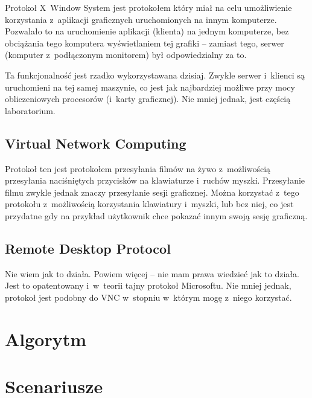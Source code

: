 \documentclass{article}
\begin{document}
Protokoł X~Window System jest protokołem który miał na celu umożliwienie
korzystania z~aplikacji graficznych uruchomionych na innym komputerze.
Pozwalało to na uruchomienie aplikacji (klienta) na jednym komputerze,
bez obciążania tego komputera wyświetlaniem tej grafiki -- zamiast tego,
serwer (komputer z~podłączonym monitorem) był odpowiedzialny za to.

Ta funkcjonalność jest rzadko wykorzystawana dzisiaj. Zwykle serwer
i~klienci są uruchomieni na tej samej maszynie, co jest jak najbardziej
możliwe przy mocy obliczeniowych procesorów (i~karty graficznej). Nie
mniej jednak, jest częścią laboratorium.

\subsection{Virtual Network Computing}

Protokoł ten jest protokołem przesyłania filmów na żywo z~możliwością
przesyłania naciśniętych przycisków na klawiaturze i~ruchów myszki.
Przesyłanie filmu zwykle jednak znaczy przesyłanie sesji graficznej.
Można korzystać z~tego protokołu z~możliwością korzystania klawiatury
i~myszki, lub bez niej, co jest przydatne gdy na przykład użytkownik
chce pokazać innym swoją sesję graficzną.

\subsection{Remote Desktop Protocol}

Nie wiem jak to działa. Powiem więcej -- nie mam prawa wiedzieć jak to działa.
Jest to opatentowany i~w~teorii tajny protokoł Microsoftu. Nie mniej jednak,
protokoł jest podobny do VNC w~stopniu w~którym mogę z~niego korzystać.

\section{Algorytm}

\section{Scenariusze}
\end{document}
